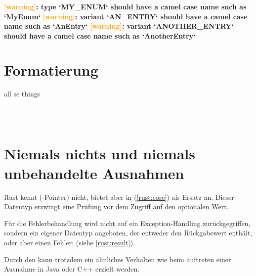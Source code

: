 \begin{small}
	\textbf{\textcolor{orange}{[warning]}: type `MY\_ENUM` should have a camel case name such as `MyEnum`}
	\textbf{\textcolor{orange}{[warning]}: variant `AN\_ENTRY` should have a camel case name such as `AnEntry`}
	\textbf{\textcolor{orange}{[warning]}: variant `ANOTHER\_ENTRY` should have a camel case name such as `AnotherEntry`}
\end{small}
\cite{rust:styleguide}

\section{Formatierung}
 all se things






 \\

 \\
\cite{rust:orly_programming}


\section{Niemals nichts und niemals unbehandelte Ausnahmen}
\label{rust:no_null}



Rust kennt (-Pointer) nicht, bietet aber in  (\autoref{rust:core})  als Ersatz an.
Dieser Datentyp erzwingt eine Prüfung vor dem Zugriff auf den optionalen Wert.


Für die Fehlerbehandlung wird nicht auf ein Exception-Handling zurückgegriffen, sondern ein eigener Datentyp angeboten, der entweder den Rückgabewert enthält, oder aber einen Fehler:  (siehe \autoref{rust:result}).

Durch den  kann trotzdem ein ähnliches Verhalten wie beim auftreten einer Ausnahme in Java oder C++ erzielt werden. 

